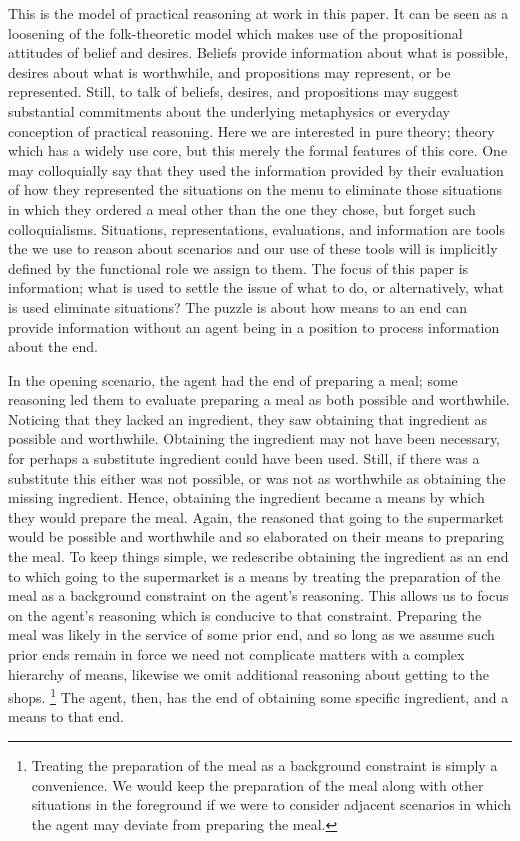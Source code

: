 \documentclass[10pt]{article}
\begin{document}
This is the model of practical reasoning at work in this paper.
It can be seen as a loosening of the folk-theoretic model which makes use of the propositional attitudes of belief and desires.
Beliefs provide information about what is possible, desires about what is worthwhile, and propositions may represent, or be represented.
Still, to talk of beliefs, desires, and propositions may suggest substantial commitments about the underlying metaphysics or everyday conception of practical reasoning.
Here we are interested in pure theory; theory which has a widely use core, but this merely the formal features of this core.
One may colloquially say that they used the information provided by their evaluation of how they represented the situations on the menu to eliminate those situations in which they ordered a meal other than the one they chose, but forget such colloquialisms.
Situations, representations, evaluations, and information are tools the we use to reason about scenarios and our use of these tools will is implicitly defined by the functional role we assign to them.
The focus of this paper is information; what is used to settle the issue of what to do, or alternatively, what is used eliminate situations?
The puzzle is about how means to an end can provide information without an agent being in a position to process information about the end.

In the opening scenario, the agent had the end of preparing a meal; some reasoning led them to evaluate preparing a meal as both possible and worthwhile.
Noticing that they lacked an ingredient, they saw obtaining that ingredient as possible and worthwhile.
Obtaining the ingredient may not have been necessary, for perhaps a substitute ingredient could have been used.
Still, if there was a substitute this either was not possible, or was not as worthwhile as obtaining the missing ingredient.
Hence, obtaining the ingredient became a means by which they would prepare the meal.
Again, the reasoned that going to the supermarket would be possible and worthwhile and so elaborated on their means to preparing the meal.
To keep things simple, we redescribe obtaining the ingredient as an end to which going to the supermarket is a means by treating the preparation of the meal as a background constraint on the agent's reasoning.
This allows us to focus on the agent's reasoning which is conducive to that constraint.
Preparing the meal was likely in the service of some prior end, and so long as we assume such prior ends remain in force we need not complicate matters with a complex hierarchy of means, likewise we omit additional reasoning about getting to the shops.\nolinebreak
\footnote{Treating the preparation of the meal as a background constraint is simply a convenience.
We would keep the preparation of the meal along with other situations in the foreground if we were to consider adjacent scenarios in which the agent may deviate from preparing the meal.}
The agent, then, has the end of obtaining some specific ingredient, and a means to that end.
\end{document}
